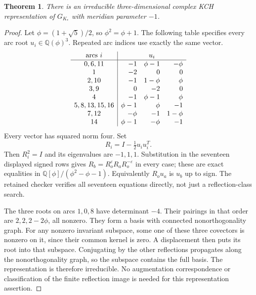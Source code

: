 \documentclass[11pt]{article}
\newtheorem{theorem}{Theorem}
\begin{document}
\begin{theorem}\label{thm:attainment}
There is an irreducible three-dimensional complex KCH
representation of $G_{K_*}$ with meridian parameter $-1$.
\end{theorem}
\begin{proof}
Let $\phi=(1+\sqrt5)/2$, so $\phi^2=\phi+1$.
The following table specifies every arc root $u_i\in\mathbb Q(\phi)^3$.
Repeated arc indices use exactly the same vector.
\[
\begin{array}{c|rrr}
\text{arcs }i&\multicolumn{3}{c}{u_i}\\\hline
0,6,11&-1&\phi-1&-\phi\\
1&-2&0&0\\
2,10&-1&1-\phi&\phi\\
3,9&0&-2&0\\
4&-1&\phi-1&\phi\\
5,8,13,15,16&\phi-1&\phi&-1\\
7,12&-\phi&-1&1-\phi\\
14&\phi-1&-\phi&-1
\end{array}
\]
Every vector has squared norm four. Set
\[
 R_i=I-\tfrac12u_i u_i^T .
\]
Then $R_i^2=I$ and its eigenvalues are $-1,1,1$.
Substitution in the seventeen displayed signed rows gives
$R_b=R_o^\varepsilon R_aR_o^{-\varepsilon}$ in every case;
these are exact equalities in $\mathbb Q[\phi]/(\phi^2-\phi-1)$.
Equivalently $R_ou_a$ is $u_b$ up to sign.
The retained checker verifies all seventeen equations directly,
not just a reflection-class search.

The three roots on arcs $1,0,8$ have determinant $-4$.
Their pairings in that order are $2,2,2-2\phi$, all nonzero.
They form a basis with connected nonorthogonality graph.
For any nonzero invariant subspace, some one of these three
covectors is nonzero on it, since their common kernel is zero.
A displacement then puts its root into that subspace.
Conjugating by the other reflections propagates along the
nonorthogonality graph, so the subspace contains the full basis.
The representation is therefore irreducible.
No augmentation correspondence or classification of the finite
reflection image is needed for this representation assertion.
\end{proof}
\end{document}
